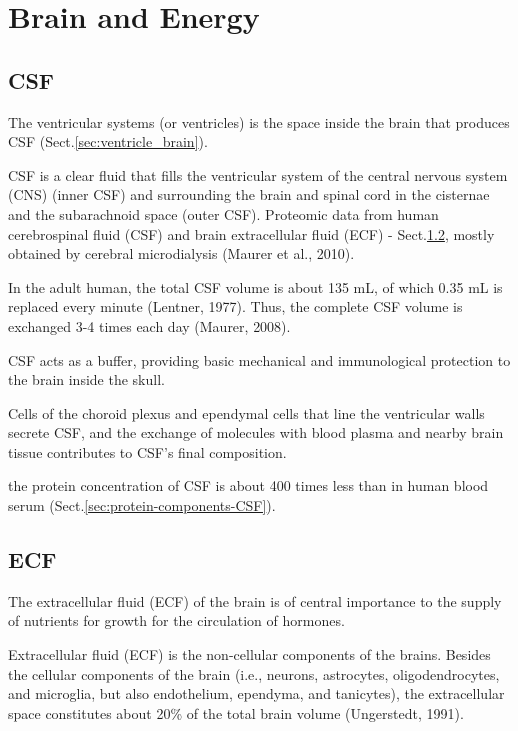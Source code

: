 \chapter{Brain and Energy}




\section{CSF}
\label{sec:CSF}


The ventricular systems (or ventricles) is the space inside the brain that
produces CSF (Sect.\ref{sec:ventricle_brain}).


CSF is a clear fluid that fills the ventricular system of the central nervous
system (CNS) (inner CSF) and surrounding the brain and spinal cord in the
cisternae and the subarachnoid space (outer CSF). Proteomic data from human
cerebrospinal fluid (CSF) and brain extracellular fluid (ECF) -
Sect.\ref{sec:ECF}, mostly obtained by cerebral microdialysis (Maurer et al.,
2010).

In the adult human, the total CSF volume is about 135 mL, of which 0.35 mL is
replaced every minute (Lentner, 1977).
Thus, the complete CSF volume is exchanged 3-4 times each day (Maurer, 2008).

CSF acts as a buffer, providing basic mechanical and immunological protection to
the brain inside the skull.

Cells of the choroid plexus and ependymal cells that line the ventricular walls
secrete CSF, and the exchange of molecules with blood plasma and nearby brain
tissue contributes to CSF's final composition.

the protein concentration of CSF is about 400 times less than in human blood
serum (Sect.\ref{sec:protein-components-CSF}).

\section{ECF}
\label{sec:ECF}

The extracellular fluid (ECF) of the brain is of central
importance to the supply of nutrients for growth for the circulation
of hormones.


Extracellular fluid (ECF) is the non-cellular components of the brains.
Besides the cellular components of the brain (i.e., neurons, astrocytes,
oligodendrocytes, and microglia, but also endothelium, ependyma, and tanicytes),
the extracellular space constitutes about 20\% of the total brain volume
(Ungerstedt, 1991).

